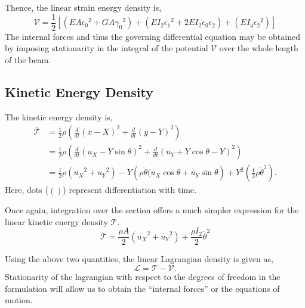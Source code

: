 \documentclass[10pt]{article}
\begin{document}
Thence, the linear strain energy density is,
\begin{equation}
  \mathcal{V} = \frac{1}{2}\left[ (EA{\epsilon_0}^2 + GA{\gamma_0}^2)
    + (EI_2{\epsilon_1}^2+2EI_2\epsilon_0\epsilon_2) + (EI_4{\epsilon_2}^2)\right]
  \label{eq:linsedens}
\end{equation}
The internal forces and thus the governing differential equation may
be obtained by imposing stationarity in the integral of the potential
$\mathcal{V}$ over the whole length of the beam.

\subsection{Kinetic Energy Density}
\label{sec:kinet-energy-dens}

The kinetic energy density is,
\begin{align}
  \bar{\mathcal{T}} &= \frac{1}{2}\rho\left({\frac{d}{dt}(x-X)}^2 +
                      {\frac{d}{dt}(y-Y)}^2\right)\nonumber\\
                    &= \frac{1}{2}\rho\left(
                      {\frac{d}{dt}(u_X-Y\sin\theta)}^2 +
                      {\frac{d}{dt}(u_Y+Y\cos\theta-Y)}^2
                      \right)\nonumber\\
                    &= \frac{1}{2}\rho(\dot{u_X}^2+\dot{u_Y}^2) -
                      Y\left(\rho\dot{\theta}(\dot{u_X}\cos\theta +
                      \dot{u_Y}\sin\theta \right)
                      + Y^2\left(\frac{1}{2}\rho \dot{\theta}^2\right).
  \label{eq:kedens}
\end{align}
Here, dots ($\dot{()}$) represent differentiation with time.

Once again, integration over the section offers a much simpler
expression for the linear kinetic energy density $\mathcal{T}$.
\begin{equation}
  \mathcal{T} = \frac{\rho A}{2}(\dot{u_X}^2 + \dot{u_Y}^2) +
  \frac{\rho I_2}{2}\dot{\theta}^2
  \label{eq:linkedens}
\end{equation}

Using the above two quantities, the linear Lagrangian density is given
as,
\begin{equation}
  \mathcal{L} = \mathcal{T} - \mathcal{V}.
  \label{eq:lageq}
\end{equation}
Stationarity of the lagrangian with respect to the degrees of freedom
in the formulation will allow us to obtain the ``internal forces'' or
the equations of motion.
\end{document}
